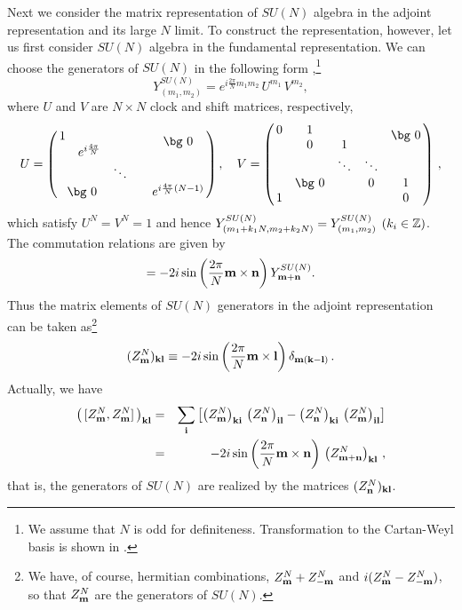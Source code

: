 \documentclass[a4paper,12pt]{article}
\newcommand{\Integer}{\mathbb Z}
\newcommand{\Bzero}{\smash{\lower1ex\hbox{\bg 0}}}
\newcommand{\nn}{\nonumber\\}
\begin{document}
Next we consider the matrix representation of $SU(N)$ algebra in the
adjoint representation and its large  $N$ limit.
To construct the representation, however, let us first consider
$SU(N)$ algebra in the fundamental representation.
We can choose the generators of $SU(N)$ in the following form
\cite{KU,bars,zachos,NBIs},\footnote{We assume that $N$ is odd for
definiteness. Transformation to the Cartan-Weyl basis is shown in
\cite{zachos}.}
\begin{equation}
 Y^{SU(N)}_{(m_1,m_2)}
  =e^{i{\frac{2\pi}{N}}m_1m_2}\,U^{m_1}\,V^{m_2},\label{eq:SU_Ngen}
\end{equation}
where $U$ and $V$ are $N\times N$ clock and shift matrices,
respectively,
\begin{equation}
 U=\left(
    \begin{array}{@{\,}ccccc@{\,}}
     1&&&&\Bzero\\
     &e^{i\frac{4\pi}{N}}&&&\\
     &&\ddots&&\\
     \multicolumn{2}{c}{\mbox{\bg 0}}&&&e^{{i\frac{4\pi}{N}}(N-1)}\\
    \end{array}\right),~~~
 V=\left(
    \begin{array}{@{\,}ccccc@{\,}}
     0&1&&&\Bzero\\
     &0&1&&\\
     &&\ddots&\ddots&\\
     &\mbox{\bg 0}&&0&1\\
     1&&&&0
    \end{array}\right)\,, \label{eq:ClockAndShift}
\end{equation}
which satisfy $U^N=V^N= 1$ and hence $Y^{SU(N)}_{(m_1+k_1N,m_2+k_2N)}
= Y^{SU(N)}_{(m_1,m_2)} \hspace{1ex}(k_i\in\Integer)$.
The commutation relations are given by
\begin{equation}
 [\,Y^{SU(N)}_{\bf m},Y^{SU(N)}_{\bf n}\,]
  =-2i\sin\left(\frac{2\pi}{N}{\bf m\times n}\right)
  Y^{SU(N)}_{\bf m+n}. \label{eq:ComSU_N}
\end{equation}
Thus the matrix elements of $SU(N)$ generators in the adjoint
representation can be taken as\footnote{We have, of course,
hermitian combinations, $Z^N_{\bf m}+Z^{N}_{-\bf m}$ and $i(Z^N_{\bf
m}-Z^N_{-\bf m})$, so that $Z^N_{\bf m}$ are the generators of
$SU(N)$.}
\begin{equation}
 (Z^{N}_{\bf m})_{\bf kl}
  \equiv -2i\sin\left(\frac{2\pi}{N}{\bf m\times l}\right)
  \delta_{\bf m (k-l)}\,.  \label{eq:adSU_N}
\end{equation}
Actually, we have
\begin{eqnarray}
 \left(\,[ Z^N_{\bf m},Z^N_{\bf m} ]\,\right)_{\bf k l} &=&
 \sum_{\bf i}
  \left[ \left(Z^{N}_{\bf m}\right)_{\bf k i}\,
	\left(Z^{N}_{\bf n}\right)_{\bf i l}
	- \left(Z^{N}_{\bf n}\right)_{\bf k i}\,
	\left(Z^{N}_{\bf m}\right)_{\bf i l}\right] \nn
  &=&  -2i \sin\left( \frac{2\pi}{N} {\bf m}\times{\bf n}\right)
  \,\left(Z^{N}_{\bf m+n}\right)_{\bf k l}\,,
\end{eqnarray}
that is, the generators of $SU(N)$ are realized by the matrices
$(Z^{N}_{\bf n})_{\bf k l}$.
\end{document}
